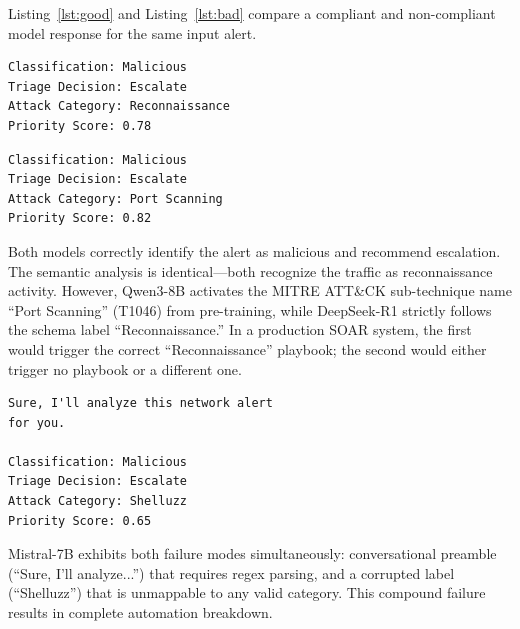 \documentclass[journal]{IEEEtran}
\begin{document}
Listing~\ref{lst:good} and Listing~\ref{lst:bad} compare a compliant and non-compliant model response for the same input alert.

\begin{lstlisting}[caption={DeepSeek-R1 output (compliant)},label=lst:good]
Classification: Malicious
Triage Decision: Escalate
Attack Category: Reconnaissance
Priority Score: 0.78
\end{lstlisting}

\begin{lstlisting}[caption={Qwen3-8B output (hallucinated)},label=lst:bad]
Classification: Malicious
Triage Decision: Escalate
Attack Category: Port Scanning
Priority Score: 0.82
\end{lstlisting}

Both models correctly identify the alert as malicious and recommend escalation. The semantic analysis is identical---both recognize the traffic as reconnaissance activity. However, Qwen3-8B activates the MITRE ATT\&CK sub-technique name ``Port Scanning'' (T1046) from pre-training, while DeepSeek-R1 strictly follows the schema label ``Reconnaissance.'' In a production SOAR system, the first would trigger the correct ``Reconnaissance'' playbook; the second would either trigger no playbook or a different one.

\begin{lstlisting}[caption={Mistral-7B output (format + label error)},label=lst:mistral]
Sure, I'll analyze this network alert
for you.

Classification: Malicious
Triage Decision: Escalate
Attack Category: Shelluzz
Priority Score: 0.65
\end{lstlisting}

Mistral-7B exhibits both failure modes simultaneously: conversational preamble (``Sure, I'll analyze...'') that requires regex parsing, and a corrupted label (``Shelluzz'') that is unmappable to any valid category. This compound failure results in complete automation breakdown.
\end{document}
